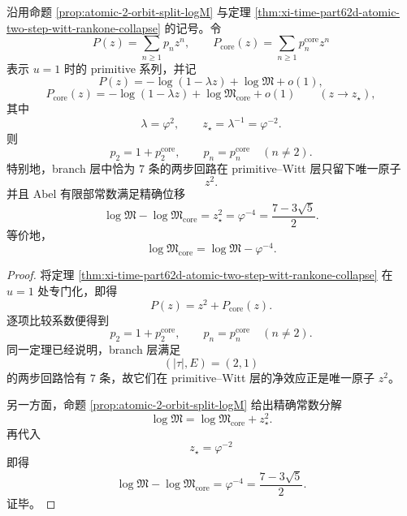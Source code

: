 \begin{theorem}\label{thm:xi-time-part62d-seven-two-step-branch-loops-single-atom-finitepart-shift}
沿用命题 \ref{prop:atomic-2-orbit-split-logM} 与定理
\ref{thm:xi-time-part62d-atomic-two-step-witt-rankone-collapse} 的记号。令
\[
P(z)=\sum_{n\ge 1}p_nz^n,
\qquad
P_{\mathrm{core}}(z)=\sum_{n\ge 1}p_n^{\mathrm{core}}z^n
\]
表示 \(u=1\) 时的 primitive 系列，并记
\[
P(z)=-\log(1-\lambda z)+\log\mathfrak M+o(1),
\]
\[
P_{\mathrm{core}}(z)=-\log(1-\lambda z)+\log\mathfrak M_{\mathrm{core}}+o(1)
\qquad
(z\to z_\star),
\]
其中
\[
\lambda=\varphi^2,
\qquad
z_\star=\lambda^{-1}=\varphi^{-2}.
\]
则
\[
p_2=1+p_2^{\mathrm{core}},
\qquad
p_n=p_n^{\mathrm{core}}
\quad(n\neq 2).
\]
特别地，branch 层中恰为 \(7\) 条的两步回路在 primitive--Witt 层只留下唯一原子
\[
z^2.
\]
并且 Abel 有限部常数满足精确位移
\[
\log\mathfrak M-\log\mathfrak M_{\mathrm{core}}
=
z_\star^2
=
\varphi^{-4}
=
\frac{7-3\sqrt5}{2}.
\]
等价地，
\[
\log\mathfrak M_{\mathrm{core}}
=
\log\mathfrak M-\varphi^{-4}.
\]
\end{theorem}
\begin{proof}
将定理 \ref{thm:xi-time-part62d-atomic-two-step-witt-rankone-collapse} 在 \(u=1\) 处专门化，即得
\[
P(z)=z^2+P_{\mathrm{core}}(z).
\]
逐项比较系数便得到
\[
p_2=1+p_2^{\mathrm{core}},
\qquad
p_n=p_n^{\mathrm{core}}
\quad(n\neq 2).
\]
同一定理已经说明，branch 层满足
\[
(|\tau|,E)=(2,1)
\]
的两步回路恰有 \(7\) 条，故它们在 primitive--Witt 层的净效应正是唯一原子 \(z^2\)。

另一方面，命题 \ref{prop:atomic-2-orbit-split-logM} 给出精确常数分解
\[
\log\mathfrak M
=
\log\mathfrak M_{\mathrm{core}}+z_\star^2.
\]
再代入
\[
z_\star=\varphi^{-2}
\]
即得
\[
\log\mathfrak M-\log\mathfrak M_{\mathrm{core}}
=
\varphi^{-4}
=
\frac{7-3\sqrt5}{2}.
\]
证毕。
\end{proof}

